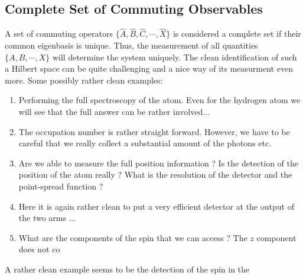 \subsection{Complete Set of Commuting Observables}

A set of commuting operators $\{\hat{A},\hat{B},\hat{C},\cdots,\hat{X}\}$ is considered a complete set if their common eigenbasis is unique. Thus, the measurement of all quantities $\{A,B,\cdots,X\}$ will determine the system uniquely. The clean identification of such a Hilbert space can be quite challenging and a nice way of its measurment even more. Some possibly rather clean examples:

\begin{enumerate}
\item Performing the full spectroscopy of the atom. Even for the hydrogen atom we will see that the full answer can be rather involved...
\item The occupation number is rather straight forward. However, we have to be careful that we really collect a substantial amount of the photons etc.
\item Are we able to measure the full position information ? Is the detection of the position of the atom really ? What is the resolution of the detector and the point-spread function ?
\item Here it is again rather clean to put a very efficient detector at the output of the two arms ...
\item What are the components of the spin that we can access ? The $z$ component does not co
\end{enumerate}

A rather clean example seems to be the detection of the spin in the 